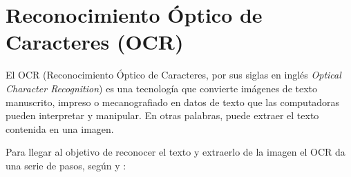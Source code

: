 \section{Reconocimiento Óptico de Caracteres (OCR)}
El OCR (Reconocimiento Óptico de Caracteres, por sus siglas en inglés \textit{Optical Character Recognition}) es una tecnología que convierte imágenes de texto manuscrito, impreso o mecanografiado en datos de texto que las computadoras pueden interpretar y manipular. En otras palabras, puede extraer el texto contenida en una imagen.

Para llegar al objetivo de reconocer el texto y extraerlo de la imagen el OCR da una serie de pasos, según \cite{Tesseract} y \cite{OCROpus}:
